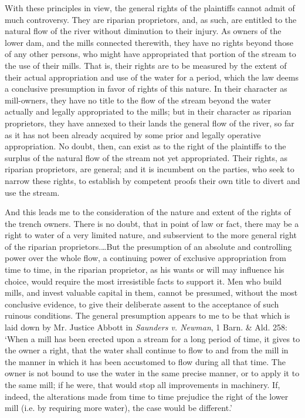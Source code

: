 With these principles in view, the general rights of the plaintiffs cannot admit
of much controversy. They are riparian proprietors, and, as such, are entitled
to the natural flow of the river without diminution to their injury. As owners
of the lower dam, and the mills connected therewith, they have no rights beyond
those of any other persons, who might have appropriated that portion of the
stream to the use of their mills. That is, their rights are to be measured by
the extent of their actual appropriation and use of the water for a period,
which the law deems a conclusive presumption in favor of rights of this nature.
In their character as mill-owners, they have no title to the flow of the stream
beyond the water actually and legally appropriated to the mills; but in their
character as riparian proprietors, they have annexed to their lands the general
flow of the river, so far as it has not been already acquired by some prior and
legally operative appropriation. No doubt, then, can exist as to the right of
the plaintiffs to the surplus of the natural flow of the stream not yet
appropriated. Their rights, as riparian proprietors, are general; and it is
incumbent on the parties, who seek to narrow these rights, to establish by
competent proofs their own title to divert and use the stream.

And this leads me to the consideration of the nature and extent of the rights of
the trench owners. There is no doubt, that in point of law or fact, there may be
a right to water of a very limited nature, and subservient to the more general
right of the riparian proprietors.\ldots But the presumption of an absolute and
controlling power over the whole flow, a continuing power of exclusive
appropriation from time to time, in the riparian proprietor, as his wants or
will may influence his choice, would require the most irresistible facts to
support it. Men who build mills, and invest valuable capital in them, cannot be
presumed, without the most conclusive evidence, to give their deliberate assent
to the acceptance of such ruinous conditions. The general presumption appears to
me to be that which is laid down by Mr. Justice Abbott in \emph{Saunders v.
Newman}, 1 Barn. \& Ald. 258: `When a mill has been erected upon a stream for a
long period of time, it gives to the owner a right, that the water shall
continue to flow to and from the mill in the manner in which it has been
accustomed to flow during all that time. The owner is not bound to use the water
in the same precise manner, or to apply it to the same mill; if he were, that
would stop all improvements in machinery. If, indeed, the alterations made from
time to time prejudice the right of the lower mill (i.e. by requiring more
water), the case would be different.'

